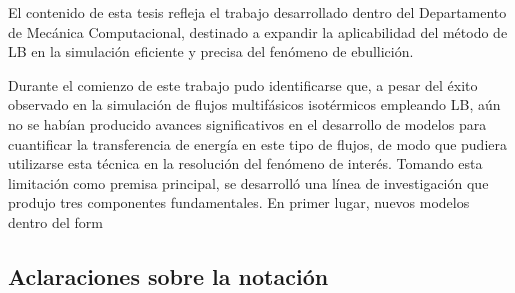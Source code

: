 El contenido de esta tesis refleja el trabajo desarrollado dentro del Departamento de Mec\'anica Computacional, destinado a expandir la aplicabilidad del m\'etodo de LB en la simulaci\'on eficiente y precisa del fen\'omeno de ebullici\'on.

Durante el comienzo de este trabajo pudo identificarse que, a pesar del \'exito observado en la simulaci\'on de flujos multif\'asicos isot\'ermicos empleando LB, a\'un no se hab\'ian producido avances significativos en el desarrollo de modelos para cuantificar la transferencia de energ\'ia en este tipo de flujos, de modo que pudiera utilizarse esta t\'ecnica en la resoluci\'on del fen\'omeno de inter\'es. Tomando esta limitaci\'on como premisa principal, se desarroll\'o una l\'inea de investigaci\'on que produjo tres componentes fundamentales. En primer lugar, nuevos modelos dentro del form



\subsection{Aclaraciones sobre la notaci\'on}